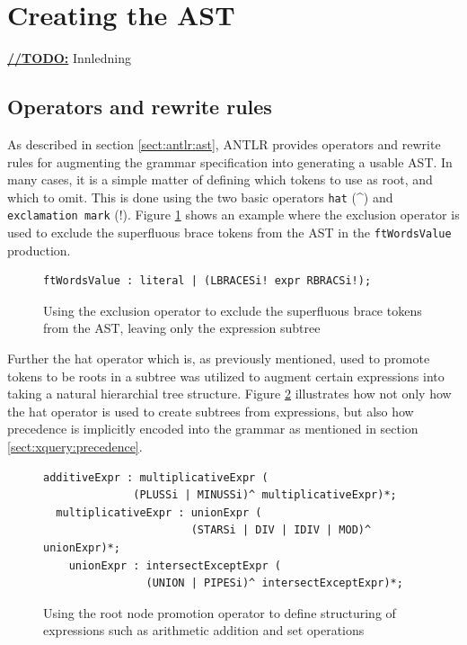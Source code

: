 \section{Creating the AST}
\label{sect:impl:ast}
\underline{\textbf{\LARGE //TODO:}} Innledning

\subsection{Operators and rewrite rules}
As described in section \ref{sect:antlr:ast}, ANTLR provides operators and
rewrite rules for augmenting the grammar specification into generating a usable
AST. In many cases, it is a simple matter of defining which tokens to use as
root, and which to omit. This is done using the two basic operators \verb!hat!
(\^{}) and \verb!exclamation mark! (!). Figure \ref{code:ast:exoperator} shows an
example where the exclusion operator is used to exclude the superfluous brace
tokens from the AST in the \verb!ftWordsValue! production.

\begin{figure}[h!]
\begin{verbatim}
ftWordsValue : literal | (LBRACESi! expr RBRACSi!);
\end{verbatim}
\caption[AST exclusion operator example]{Using the exclusion operator to exclude
the superfluous brace tokens from the AST, leaving only the expression subtree}
\label{code:ast:exoperator}
\end{figure}

Further the hat operator which is, as previously mentioned, used to promote
tokens to be roots in a subtree was utilized to augment certain expressions into
taking a natural hierarchial tree structure. Figure \ref{code:ast:hatoperator}
illustrates how not only how the hat operator is used to create subtrees from
expressions, but also how precedence is implicitly encoded into the grammar as
mentioned in section \ref{sect:xquery:precedence}.

\begin{figure}[h!]
\begin{verbatim}
additiveExpr : multiplicativeExpr (
              (PLUSSi | MINUSSi)^ multiplicativeExpr)*;
  multiplicativeExpr : unionExpr (
                       (STARSi | DIV | IDIV | MOD)^ unionExpr)*;
    unionExpr : intersectExceptExpr (
                (UNION | PIPESi)^ intersectExceptExpr)*;
\end{verbatim}
\caption[AST root node promotion operator example]{Using the root node promotion
operator to define structuring of expressions such as arithmetic addition and set
operations}
\label{code:ast:hatoperator}
\end{figure}

